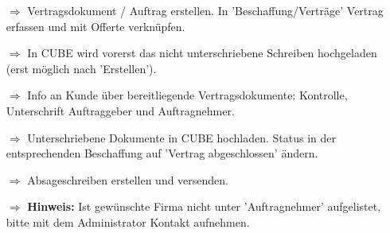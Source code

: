 \documentclass{article}
\begin{document}
\begin{tcolorbox}[colback=blue!5,colframe=blue!40!black,title=(5) Vertrag ausstellen / Abschluss der Beschaffung]
\begin{itemize}
  \item[$\Longrightarrow$] Vertragsdokument / Auftrag erstellen. In 'Beschaffung/Verträge' Vertrag erfassen und mit Offerte verknüpfen.
	\item[$\Longrightarrow$] In CUBE wird vorerst das nicht unterschriebene Schreiben hochgeladen (erst möglich nach 'Erstellen').
  \item[$\Longrightarrow$] Info an Kunde über bereitliegende Vertragsdokumente: Kontrolle, Unterschrift Auftraggeber und Auftragnehmer.
	\item[$\Longrightarrow$] Unterschriebene Dokumente in CUBE hochladen. Status in der entsprechenden Beschaffung auf 'Vertrag abgeschlossen' ändern.
	\item[$\Longrightarrow$] Absageschreiben erstellen und versenden.
	\item[$\Longrightarrow$] \textbf{Hinweis:} Ist gewünschte Firma nicht unter 'Auftragnehmer' aufgelistet, bitte mit dem Administrator Kontakt aufnehmen.
\end{itemize}
\end{tcolorbox}



\end{document}
